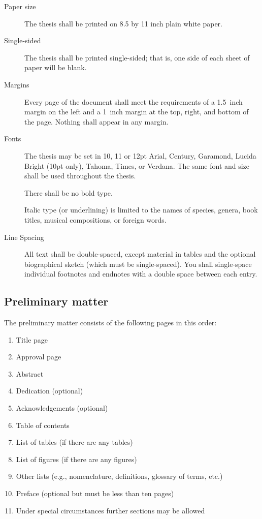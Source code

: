 \begin{description}
\item[Paper size] The thesis shall be printed on 8.5 by 11 inch plain
white paper.

\item[Single-sided] The thesis shall be printed single-sided; that is,
one side of each sheet of paper will be blank.

\item[Margins] Every page of the document shall meet the requirements of
a 1.5~inch margin on the left and a 1~inch margin at the top, right, and 
bottom of the page. Nothing shall appear in any margin.

\item[Fonts] The thesis may be set in 10, 11 or 12pt 
Arial, 
Century, 
Garamond,
Lucida Bright (10pt only), 
Tahoma, 
Times, or 
Verdana. 
The same font and size shall be used throughout the thesis. 

    There shall be no bold type.

 Italic type (or underlining) is limited to the names of species, genera, 
book titles, musical compositions, or foreign words.

\item[Line Spacing] All text shall be double-spaced, except material in tables
and the optional biographical sketch (which must be single-spaced). You shall
single-space individual footnotes and endnotes with a double space between
each entry.
\end{description}

\subsection{Preliminary matter}

The preliminary matter consists of the following pages in this
order:
\begin{enumerate}
\item Title page
\item Approval page
\item Abstract
\item Dedication (optional)
\item Acknowledgements (optional)
\item Table of contents
\item List of tables (if there are any tables)
\item List of figures (if there are any figures)
\item Other lists (e.g., nomenclature, definitions, glossary of terms, etc.)
\item Preface (optional but must be less than ten pages)
\item Under special circumstances further sections may be allowed
\end{enumerate}


